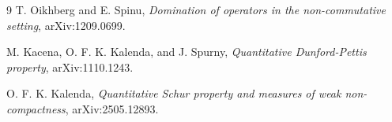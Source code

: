 \documentclass[11pt]{article}
\begin{document}
\begin{thebibliography}{9}
T. Oikhberg and E. Spinu,
\emph{Domination of operators in the non-commutative setting},
arXiv:1209.0699.

M. Kacena, O. F. K. Kalenda, and J. Spurny,
\emph{Quantitative Dunford-Pettis property},
arXiv:1110.1243.

O. F. K. Kalenda,
\emph{Quantitative Schur property and measures of weak non-compactness},
arXiv:2505.12893.
\end{thebibliography}
\end{document}
